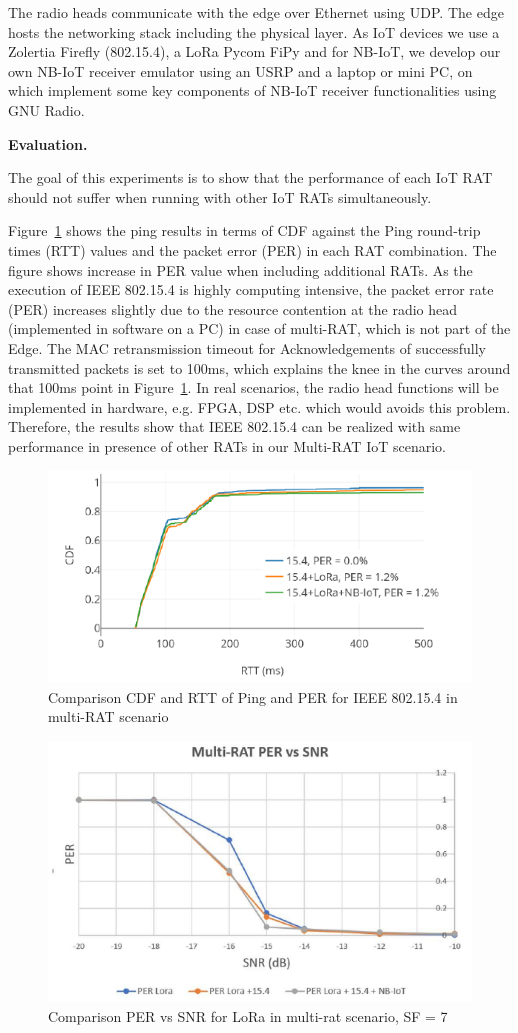\documentclass[10pt,emptycopyrightspace]{ewsn-proc}
\newcommand{\fakepar}[1]{\noindent\textbf{#1.}}
\begin{document}
The radio heads communicate with the edge over Ethernet using UDP. The edge hosts the networking stack including the physical layer. As IoT devices we use a Zolertia Firefly (802.15.4), a LoRa  Pycom FiPy and for NB-IoT, we develop our own NB-IoT receiver emulator using an USRP and a laptop or mini PC, on which implement some key components of NB-IoT receiver functionalities using GNU Radio.

\fakepar{Evaluation}

The goal of this experiments is to show that the
performance of each IoT RAT should not suffer when running with other IoT RATs simultaneously.

Figure~\ref{fig:5-5} shows the ping results in terms of CDF against
the Ping round-trip times (RTT) values and the packet error (PER) in
each RAT combination.  The figure shows increase in PER value when
including additional RATs.  As the execution of IEEE 802.15.4 is
highly computing intensive, the packet error rate (PER) increases
slightly due to the resource contention at the radio head (implemented
in software on a PC) in case of multi-RAT, which is not part of the
Edge. The MAC retransmission timeout for Acknowledgements of
successfully transmitted packets is set to 100ms, which explains the
knee in the curves around that 100ms point in Figure~\ref{fig:5-5}.
In real scenarios, the radio head functions will be implemented in
hardware, e.g. FPGA, DSP etc. which would avoids this
problem. Therefore, the results show that IEEE 802.15.4 can be
realized with same performance in presence of other RATs in our
Multi-RAT IoT scenario.



\begin{figure}[h]
  \centering
	\includegraphics[width= 0.4 \textwidth]{5-5.png}
	\caption{Comparison CDF and RTT of Ping and PER for IEEE
802.15.4 in multi-RAT scenario}
	\label{fig:5-5}
\end{figure}


\begin{figure}[h]
  \vspace{-0.3cm}
	\centering
	\includegraphics[width= 0.4 \textwidth]{5-6.png}
	\caption{Comparison PER vs SNR for LoRa in multi-rat scenario, SF = 7
}
	\label{fig:5-6}
\end{figure}
\end{document}
